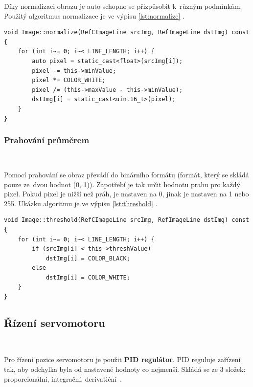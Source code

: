 Díky normalizaci obrazu je auto schopno se přizpůsobit k~různým  podmínkám. Použitý
algoritmus normalizace je ve výpisu \ref{lst:normalize} \cite{robot}.
\begin{lstlisting}[caption = Normalizace obrazu, label = lst:normalize]
void Image::normalize(RefCImageLine srcImg, RefImageLine dstImg) const {
    for (int i~= 0; i~< LINE_LENGTH; i++) {
        auto pixel = static_cast<float>(srcImg[i]);
        pixel -= this->minValue;
        pixel *= COLOR_WHITE;
        pixel /= (this->maxValue - this->minValue);
        dstImg[i] = static_cast<uint16_t>(pixel);
    }
}
\end{lstlisting}

\subsubsection*{Prahování průměrem}\

Pomocí prahování se obraz převádí do binárního formátu (formát, který se skládá
pouze ze~dvou hodnot (0, 1)). Zapotřebí je tak určit hodnotu prahu pro každý pixel.
Pokud pixel je nižší než práh, je nastaven na 0, jinak je nastaven na 1 nebo 255.
Ukázku algoritmu je ve výpisu \ref{lst:threshold} \cite{robot}.
\begin{lstlisting}[caption = Prahování průměrem, label = lst:threshold]
void Image::threshold(RefCImageLine srcImg, RefImageLine dstImg) const {
    for (int i~= 0; i~< LINE_LENGTH; i++) {
        if (srcImg[i] < this->threshValue)
            dstImg[i] = COLOR_BLACK;
        else
            dstImg[i] = COLOR_WHITE;
    }
}
\end{lstlisting}

\subsection{Řízení servomotoru}\
\label{sec:servocontrol}

Pro řízení pozice servomotoru je použit \textbf{PID regulátor}. PID reguluje
zařízení tak, aby odchylka byla od nastavené hodnoty co nejmenší. Skládá se ze 3
složek: proporcionální, integrační, derivatiční~\cite{PID}.

